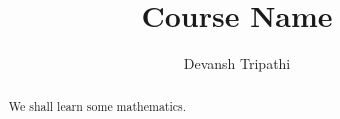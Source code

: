\documentclass[12pt,reqno]{amsart}
\title{Course Name}
\author{Devansh Tripathi}
\theoremstyle{plain}
\begin{document}
\begin{abstract}
    We shall learn some mathematics.
\end{abstract}
\maketitle
\end{document}
